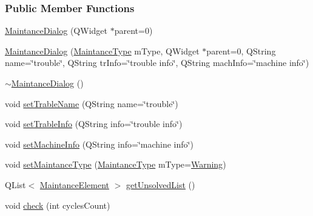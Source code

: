 \subsubsection*{Public Member Functions}
\begin{DoxyCompactItemize}
\item 
\mbox{\hyperlink{classMaintanceDialog_a3f541a92622740cce0a8f66e5de506fd}{Maintance\+Dialog}} (Q\+Widget $\ast$parent=0)
\item 
\mbox{\hyperlink{classMaintanceDialog_adce1e1f1bf5989b01784faf777b8a40e}{Maintance\+Dialog}} (\mbox{\hyperlink{classMaintanceDialog_a0774fde5cbe916c333d8d1dd991a3b8f}{Maintance\+Type}} m\+Type, Q\+Widget $\ast$parent=0, Q\+String name=\char`\"{}trouble\char`\"{}, Q\+String tr\+Info=\char`\"{}trouble info\char`\"{}, Q\+String mach\+Info=\char`\"{}machine info\char`\"{})
\item 
\mbox{\hyperlink{classMaintanceDialog_a96b4b3c7702a5a3fb51c7d5327cb82e1}{$\sim$\+Maintance\+Dialog}} ()
\item 
void \mbox{\hyperlink{classMaintanceDialog_a2f690d0f71452b2471282fdba269928b}{set\+Trable\+Name}} (Q\+String name=\char`\"{}trouble\char`\"{})
\item 
void \mbox{\hyperlink{classMaintanceDialog_a7f1a8997a72655a25eb57975c5535736}{set\+Trable\+Info}} (Q\+String info=\char`\"{}trouble info\char`\"{})
\item 
void \mbox{\hyperlink{classMaintanceDialog_a9c71badea52d72c56dee328a7de15005}{set\+Machine\+Info}} (Q\+String info=\char`\"{}machine info\char`\"{})
\item 
void \mbox{\hyperlink{classMaintanceDialog_a38b7cab71ff559010bef483adec52227}{set\+Maintance\+Type}} (\mbox{\hyperlink{classMaintanceDialog_a0774fde5cbe916c333d8d1dd991a3b8f}{Maintance\+Type}} m\+Type=\mbox{\hyperlink{classMaintanceDialog_a0774fde5cbe916c333d8d1dd991a3b8fa8fe148a4b5ff71d3568fd6aff35d027e}{Warning}})
\item 
Q\+List$<$ \mbox{\hyperlink{classMaintanceElement}{Maintance\+Element}} $>$ \mbox{\hyperlink{classMaintanceDialog_af304179c775853116b308ed635f8d027}{get\+Unsolved\+List}} ()
\item 
void \mbox{\hyperlink{classMaintanceDialog_a0eb162bfea71b4712de3cc63cc6bb0f5}{check}} (int cycles\+Count)
\end{DoxyCompactItemize}

